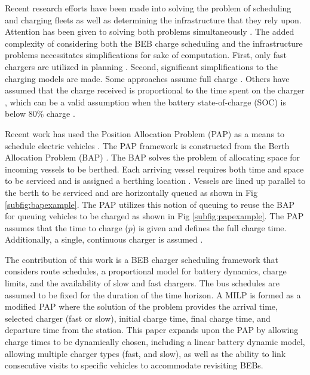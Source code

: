 \documentclass[letterpaper, 10pt, conference]{IEEEtran}
\begin{document}
Recent research efforts have been made into solving the problem of scheduling and charging fleets as well as determining the infrastructure that they rely upon. Attention has been given to solving both problems simultaneously \cite{Wei2018, Sebastiani2016, Hoke2014, Wang2017}.  The added complexity of considering both the BEB charge scheduling and the infrastructure problems necessitates simplifications for sake of computation. First, only fast chargers are utilized in planning \cite{Wei2018, Sebastiani2016, Wang2017, Zhou2020, Liu2020, Yang2018, Wang2017a, Qin2016}. Second, significant simplifications to the charging models are made. Some approaches assume full charge \cite{Wei2018, Wang2017, Zhou2020, Wang2017a}. Others have assumed that the charge received is proportional to the time spent on the charger \cite{Liu2020, Yang2018}, which can be a valid assumption when the battery state-of-charge (SOC) is below 80\% charge \cite{Liu2020}.

Recent work has used the Position Allocation Problem (PAP) as a means to schedule electric vehicles \cite{Qarebagh2019}. The PAP framework is constructed from the Berth Allocation Problem (BAP) \cite{Qarebagh2019}. The BAP solves the problem of allocating space for incoming vessels to be berthed. Each arriving vessel requires both time and space to be serviced and is assigned a berthing location \cite{Imai2001}. Vessels are lined up parallel to the berth to be serviced and are horizontally queued as shown in Fig \ref{subfig:bapexample}. The PAP utilizes this notion of queuing to reuse the BAP for queuing vehicles to be charged as shown in Fig \ref{subfig:papexample}. The PAP assumes that the time to charge (\(p\)) is given and defines the full charge time. Additionally, a single, continuous charger is assumed \cite{Qarebagh2019}.

The contribution of this work is a BEB charger scheduling framework that considers route schedules, a proportional model for battery dynamics, charge limits, and the availability of slow and fast chargers. The bus schedules are assumed to be fixed for the duration of the time horizon. A MILP is formed as a modified PAP \cite{Qarebagh2019} where the solution of the problem provides the arrival time, selected charger (fast or slow), initial charge time, final charge time, and departure time from the station. This paper expands upon the PAP by allowing charge times to be dynamically chosen, including a linear battery dynamic model, allowing multiple charger types (fast, and slow), as well as the ability to link consecutive visits to specific vehicles to accommodate revisiting BEBs.
\end{document}
